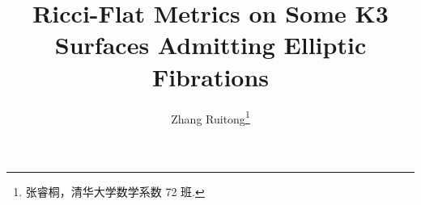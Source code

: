 \documentclass[twosides]{article}
\begin{document}
\title{Ricci-Flat Metrics on Some K3\\ Surfaces Admitting Elliptic Fibrations}
\author{Zhang Ruitong\footnote{张睿桐，清华大学数学系数 72 班.}}



\tableofcontents







\printbibliography
\end{document}
